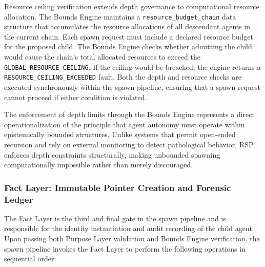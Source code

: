 Resource ceiling verification extends depth governance to computational resource allocation. The Bounds Engine maintains a \texttt{resource\_budget\_chain} data structure that accumulates the resource allocations of all descendant agents in the current chain. Each spawn request must include a declared resource budget for the proposed child. The Bounds Engine checks whether admitting the child would cause the chain's total allocated resources to exceed the \texttt{GLOBAL\_RESOURCE\_CEILING}. If the ceiling would be breached, the engine returns a \texttt{RESOURCE\_CEILING\_EXCEEDED} fault. Both the depth and resource checks are executed synchronously within the spawn pipeline, ensuring that a spawn request cannot proceed if either condition is violated.

The enforcement of depth limits through the Bounds Engine represents a direct operationalization of the principle that agent autonomy must operate within epistemically bounded structures. Unlike systems that permit open-ended recursion and rely on external monitoring to detect pathological behavior, RSP enforces depth constraints structurally, making unbounded spawning computationally impossible rather than merely discouraged.

\subsubsection{Fact Layer: Immutable Pointer Creation and Forensic Ledger}
\label{subsection:fact-layer}

The Fact Layer is the third and final gate in the spawn pipeline and is responsible for the identity instantiation and audit recording of the child agent. Upon passing both Purpose Layer validation and Bounds Engine verification, the spawn pipeline invokes the Fact Layer to perform the following operations in sequential order:

